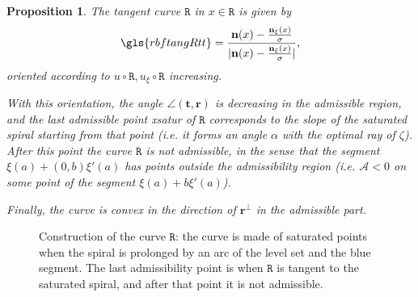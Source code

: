 \documentclass[reqno]{amsart}
\theoremstyle{definition} \newtheorem{definition}{Definition}[section]
\theoremstyle{definition} \newtheorem{remark}[definition]{Remark}
\theoremstyle{plain} \newtheorem{lemma}[definition]{Lemma}
\theoremstyle{plain} \newtheorem{proposition}[definition]{Proposition}
\theoremstyle{plain} \newtheorem{theorem}[definition]{Theorem}
\theoremstyle{plain} \newtheorem{corollary}[definition]{Corollary}
\theoremstyle{definition} \newtheorem{example}[definition]{Example}
\theoremstyle{plain} \newtheorem{claim}[clai]{Claim}
\theoremstyle{definition} \newtheorem{assumption}[definition]{Assumption}
\theoremstyle{definition} \newtheorem{observation}[definition]{Observation}
\newcommand{\1}{\mathbbm 1}
\numberwithin{equation}{section} %
\theoremstyle{plain} \newtheorem*{theorem*}{Theorem}
\theoremstyle{plain} \newtheorem{mthm}[maintheorem]{Main Theorem}
\theoremstyle{plain} \newtheorem*{mthm*}{Main Theorem}
\theoremstyle{plain} \newtheorem*{conjecture*}{Conjecture}
\theoremstyle{plain} \newtheorem{conjecture}[definition]{Conjecture}
\theoremstyle{plain} \newtheorem*{problem*}{Problem}
\begin{document}
\begin{proposition}
\label{Prop:der_calR}
The tangent curve $\mathtt R$ in $x \in \mathtt R$ is given by 
\begin{equation*}
\gls{rbftangRtt} = \frac{\mathbf n(x) - \frac{\mathbf n_\xi(x)}{\sigma}}{|\mathbf n(x) - \frac{\mathbf n_\xi(x)}{\sigma}|},
\end{equation*}
oriented according to $u \circ \mathtt R,u_\xi \circ \mathtt R$ increasing.

With this orientation, the angle $\angle(\mathbf t,\mathbf r)$ is decreasing in the admissible region, and the last admissible point  \gls{xsatur} of $\mathtt R$ corresponds to the slope of the saturated spiral starting from that point (i.e. it forms an angle $\alpha$ with the optimal ray of $\zeta$). After this point the curve $\mathtt R$ is not admissible, in the sense that the segment $\xi(a) + (0,b) \xi'(a)$ has points outside the admissibility region (i.e. $\mathcal A < 0$ on some point of the segment $\xi(a) + b \xi'(a)$).

Finally, the curve is convex in the direction of $\mathbf r^\perp$ in the admissible part.
\end{proposition}

\begin{figure}
\centering

\caption{Construction of the curve $\mathtt R$: the curve is made of saturated points when the spiral is prolonged by an arc of the level set and the blue segment. The last admissibility point is when $\mathtt R$ is tangent to the saturated spiral, and after that point it is not admissible.}
\label{fig:non:adm}
\end{figure}
\end{document}

